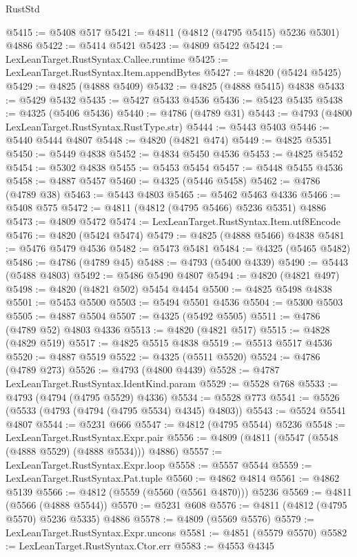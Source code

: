 \begin{lexlean}{RustStd}
\begin{coremodule}
@5415 := @5408 @517
@5421 := @4811 (@4812 (@4795 @5415) @5236 @5301) @4886
@5422 := @5414 @5421
@5423 := @4809 @5422
@5424 := LexLeanTarget.RustSyntax.Callee.runtime
@5425 := LexLeanTarget.RustSyntax.Item.appendBytes
@5427 := @4820 (@5424 @5425)
@5429 := @4825 (@4888 @5409)
@5432 := @4825 (@4888 @5415) @4838
@5433 := @5429 @5432
@5435 := @5427 @5433 @4536
@5436 := @5423 @5435
@5438 := @4325 (@5406 @5436)
@5440 := @4786 (@4789 @31)
@5443 := @4793 (@4800 LexLeanTarget.RustSyntax.RustType.str)
@5444 := @5443 @5403
@5446 := @5440 @5444 @4807
@5448 := @4820 (@4821 @474)
@5449 := @4825 @5351
@5450 := @5449 @4838
@5452 := @4834 @5450 @4536
@5453 := @4825 @5452
@5454 := @5302 @4838
@5455 := @5453 @5454
@5457 := @5448 @5455 @4536
@5458 := @4887 @5457
@5460 := @4325 (@5446 @5458)
@5462 := @4786 (@4789 @38)
@5463 := @5443 @4803
@5465 := @5462 @5463 @4336
@5466 := @5408 @575
@5472 := @4811 (@4812 (@4795 @5466) @5236 @5351) @4886
@5473 := @4809 @5472
@5474 := LexLeanTarget.RustSyntax.Item.utf8Encode
@5476 := @4820 (@5424 @5474)
@5479 := @4825 (@4888 @5466) @4838
@5481 := @5476 @5479 @4536
@5482 := @5473 @5481
@5484 := @4325 (@5465 @5482)
@5486 := @4786 (@4789 @45)
@5488 := @4793 (@5400 @4339)
@5490 := @5443 (@5488 @4803)
@5492 := @5486 @5490 @4807
@5494 := @4820 (@4821 @497)
@5498 := @4820 (@4821 @502) @5454 @4454
@5500 := @4825 @5498 @4838
@5501 := @5453 @5500
@5503 := @5494 @5501 @4536
@5504 := @5300 @5503
@5505 := @4887 @5504
@5507 := @4325 (@5492 @5505)
@5511 := @4786 (@4789 @52) @4803 @4336
@5513 := @4820 (@4821 @517)
@5515 := @4828 (@4829 @519)
@5517 := @4825 @5515 @4838
@5519 := @5513 @5517 @4536
@5520 := @4887 @5519
@5522 := @4325 (@5511 @5520)
@5524 := @4786 (@4789 @273)
@5526 := @4793 (@4800 @4439)
@5528 := @4787 LexLeanTarget.RustSyntax.IdentKind.param
@5529 := @5528 @768
@5533 := @4793 (@4794 (@4795 @5529) @4336)
@5534 := @5528 @773
@5541 := @5526 (@5533 (@4793 (@4794 (@4795 @5534) @4345) @4803))
@5543 := @5524 @5541 @4807
@5544 := @5231 @666
@5547 := @4812 (@4795 @5544) @5236
@5548 := LexLeanTarget.RustSyntax.Expr.pair
@5556 := @4809 (@4811 (@5547 (@5548 (@4888 @5529) (@4888 @5534))) @4886)
@5557 := LexLeanTarget.RustSyntax.Expr.loop
@5558 := @5557 @5544
@5559 := LexLeanTarget.RustSyntax.Pat.tuple
@5560 := @4862 @4814
@5561 := @4862 @5139
@5566 := @4812 (@5559 (@5560 (@5561 @4870))) @5236
@5569 := @4811 (@5566 (@4888 @5544))
@5570 := @5231 @608
@5576 := @4811 (@4812 (@4795 @5570) @5236 @5335) @4886
@5578 := @4809 (@5569 @5576)
@5579 := LexLeanTarget.RustSyntax.Expr.uncons
@5581 := @4851 (@5579 @5570)
@5582 := LexLeanTarget.RustSyntax.Ctor.err
@5583 := @4553 @4345

\end{coremodule}
\end{lexlean}
